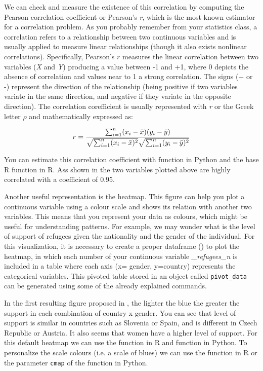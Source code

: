 We can check and measure the existence of this correlation by computing the Pearson correlation coefficient or Pearson's \emph{r}, which is the most known estimator for a correlation problem. As you probably remember from your statistics class, a correlation refers to a relationship between two continuous variables and is usually applied to measure linear relationships (though it also exists nonlinear correlations). Specifically, Pearson's $r$  measures the linear correlation between two variables (\emph{X} and \emph{Y}) producing a value between -1 and +1, where 0 depicts the absence of correlation and values near to 1 a strong correlation. The signs (+ or -) represent the direction of the relationship (being positive if two variables variate in the same direction, and negative if they variate in the opposite direction). The correlation corefficient is usually represented with \emph{r} or the Greek letter $\rho$ and mathematically expressed as:

$$
  r =
  \frac{ \sum_{i=1}^{n}(x_i-\bar{x})(y_i-\bar{y}) }{%
        \sqrt{\sum_{i=1}^{n}(x_i-\bar{x})^2}\sqrt{\sum_{i=1}^{n}(y_i-\bar{y})^2}}
$$

You can estimate this correlation coefficient with  function  in Python and the base R function  in R. Ass shown in  the two variables plotted above are highly correlated with a coefficient of 0.95.


Another useful representation is the heatmap. This figure can help you plot a continuous variable using a colour scale and shows its relation with another two variables.  This means that you represent your data as colours, which might be useful for understanding patterns. For example, we may wonder what is the level of support of refugees given the nationality and the gender of the individual. For this visualization, it is necessary to create a proper dataframe () to plot the heatmap, in which each number of your continuous variable \emph{\_refugees\_n} is included in a table where each axis (x= gender, y=country) represents the categorical variables. This pivoted table stored in an object called \texttt{pivot\_data} can be generated using some of the already explained commands.


In the first resulting figure proposed in , the lighter the blue the greater the support in each combination of country x gender. You can see that level of support is similar in countries such as Slovenia or Spain, and is different in Czech Republic or Austria. It also seems that women have a higher level of support. For this default heatmap we can use the  function  in R and  function  in Python.  To personalize the scale colours (i.e. a scale of blues) we can use the  function  in R or the parameter \texttt{cmap} of the  function  in Python. 

